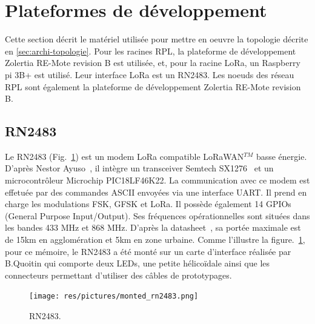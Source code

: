 \section{Plateformes de développement}\label{hardware}
\renewcommand{\rightmark}{Plateformes de développement}
    Cette section décrit le matériel utilisée pour mettre en oeuvre la topologie décrite en
    \autoref{sec:archi-topologie}. Pour les racines RPL, la plateforme de développement Zolertia 
    RE-Mote revision B est utilisée, et,  pour la racine LoRa, un Raspberry pi 3B+ est utilisé. 
    Leur interface LoRa est un RN2483. Les noeuds des réseau RPL sont également la plateforme de 
    développement Zolertia RE-Mote revision B.

\subsection*{RN2483}\label{hardware:rn2483}
    Le RN2483 (Fig.~\ref{fig:state-rn2483}) est un modem LoRa compatible LoRaWAN$^{TM}$ basse énergie. D'après Nestor Ayuso~\cite{ayuso_2015}, il intègre un transceiver Semtech SX1276~\cite{sx1276:datasheet} et un microcontrôleur Microchip PIC18LF46K22.
    La communication avec ce modem est effetuée par des commandes ASCII envoyées via une interface UART. Il prend en charge les modulations FSK, GFSK et LoRa. Il possède également 14 GPIOs (General Purpose Input/Output).
    Ses fréquences opérationnelles sont situées dans les bandes 433 MHz et 868 MHz.
    D'après la datasheet~\cite{rn2483:datasheet}, 
    sa portée maximale est de 15km en agglomération et 5km en zone urbaine. Comme l'illustre la figure.~\ref{fig:state-rn2483}, pour ce mémoire, le RN2483 a été monté sur un carte d'interface réalisée par B.Quoitin qui comporte deux LEDs, une petite hélicoïdale ainsi que les connecteurs permettant d'utiliser des câbles de prototypages.

    \begin{figure}[H]
        \centering
        \texttt{[image: res/pictures/monted\_rn2483.png]}
        \caption{RN2483.}
        \label{fig:state-rn2483}
    \end{figure}

